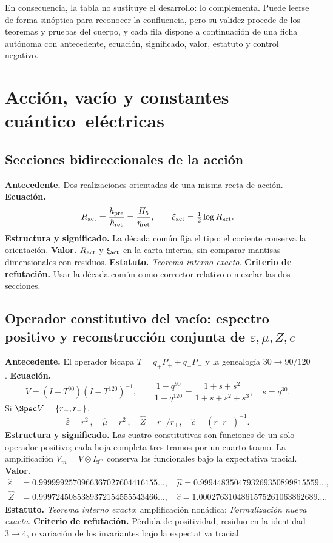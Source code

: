 En consecuencia, la tabla no sustituye el desarrollo: lo complementa. Puede leerse
de forma sinóptica para reconocer la confluencia, pero su validez procede de los
teoremas y pruebas del cuerpo, y cada fila dispone a continuaci\'on de una
ficha aut\'onoma con antecedente, ecuaci\'on, significado, valor, estatuto y
control negativo.

\section{Acci\'on, vac\'io y constantes cu\'antico--el\'ectricas}

\subsection*{Secciones bidireccionales de la acci\'on }
\textbf{Antecedente.} Dos realizaciones orientadas de una misma recta de
acci\'on. \textbf{Ecuaci\'on.}
\[
R_{\rm act}=\frac{\hbar_{\rm pre}}{\hbar_{\rm ret}}
=\frac{H_5}{\eta_{\rm ret}},
\qquad \xi_{\rm act}=\tfrac12\log R_{\rm act}.
\]
\textbf{Estructura y significado.} La d\'ecada com\'un fija el tipo; el cociente
conserva la orientaci\'on. \textbf{Valor.} \(R_{\rm act}\) y
\(\xi_{\rm act}\) en la carta interna, sin comparar mantisas dimensionales con
residuos. \textbf{Estatuto.} \emph{Teorema interno exacto}.
\textbf{Criterio de refutación.} Usar la d\'ecada com\'un como corrector relativo o mezclar
las dos secciones.

\subsection*{Operador constitutivo del vacío: espectro positivo y reconstrucción conjunta de \(\varepsilon,\mu,Z,c\)}
\textbf{Antecedente.} El operador bicapa \(T=q_+P_++q_-P_-\) y la genealog\'ia
\(30\to90/120\). \textbf{Ecuaci\'on.}
\[
V=(I-T^{90})(I-T^{120})^{-1},
\qquad
\frac{1-q^{90}}{1-q^{120}}
=\frac{1+s+s^2}{1+s+s^2+s^3},\quad s=q^{30}.
\]
Si \(\Spec V=\{r_+,r_-\}\),
\[
\widehat\varepsilon=r_+^2,
\quad\widehat\mu=r_-^2,
\quad\widehat Z=r_-/r_+,
\quad\widehat c=(r_+r_-)^{-1}.
\]
\textbf{Estructura y significado.} Las cuatro constitutivas son funciones de
un solo operador positivo; cada hoja completa tres tramos por un cuarto tramo.
La amplificaci\'on \(V_m=V\otimes I_{9^m}\) conserva los funcionales bajo
la expectativa tracial.
\textbf{Valor.}
\begin{align*}
\widehat\varepsilon&=0.9999992570966367027604416155\ldots,\quad
\widehat\mu=0.9994483504793269350899815559\ldots,\\
\widehat Z&=0.9997245085389372154555543466\ldots,\quad
\widehat c=1.0002763104861575261063862689\ldots.
\end{align*}
\textbf{Estatuto.} \emph{Teorema interno exacto}; amplificaci\'on non\'adica:
\emph{Formalizaci\'on nueva exacta}. \textbf{Criterio de refutación.} P\'erdida de
positividad, residuo en la identidad \(3\to4\), o variaci\'on de los
invariantes bajo la expectativa tracial.


